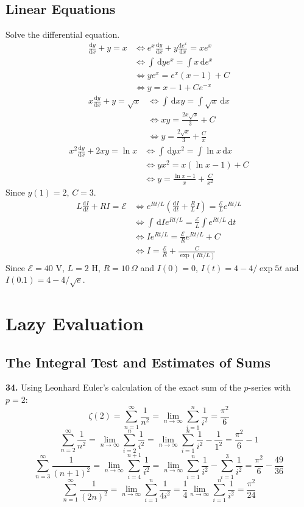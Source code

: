 \documentclass[a4paper,12pt]{article}
\newcommand{\ud}{\,\mathrm{d}}
\newcommand{\leibniz}[3][]{\frac{\mathrm{d} #1 #2}{\mathrm{d} #3 #1}}
\begin{document}
\subsection{Linear Equations}
Solve the differential equation.
\begin{align*}
  \leibniz{y}{x} + y = x
  &\iff e^x\leibniz{y}{x} + y\leibniz{e^x}{x} = xe^x\\
  &\iff \int\ud ye^x = \int x\ud e^x\\
  &\iff ye^x = e^x(x - 1) + C\\
  &\iff y = x - 1 + Ce^{-x}\tag{7}
\end{align*}
\begin{align*}
  x\leibniz{y}{x} + y = \sqrt x
  &\iff \int\ud xy = \int\sqrt x\ud x\\
  &\iff xy = \frac{2x\sqrt x}{3} + C\\
  &\iff y = \frac{2\sqrt x}{3} + \frac{C}{x}\tag{9}
\end{align*}
\begin{align*}
  x^2\leibniz{y}{x} + 2xy = \ln x
  &\iff \int\ud yx^2 = \int\ln x\ud x\\
  &\iff yx^2 = x(\ln x - 1) + C\\
  &\iff y = \frac{\ln x - 1}{x} + \frac{C}{x^2}
\end{align*}
Since $y(1) = 2$, $C = 3$.
\begin{align*}
  L\leibniz{I}{t} + RI = \mathcal E
  &\iff e^{Rt/L}\left(\leibniz{I}{t} + \frac{R}{L}I\right)
  = \frac{\mathcal E}{L}e^{Rt/L}\\
  &\iff \int\ud Ie^{Rt/L} = \frac{\mathcal E}{L}\int e^{Rt/L}\ud t\\
  &\iff Ie^{Rt/L} = \frac{\mathcal E}{R}e^{Rt/L} + C\\
  &\iff I = \frac{\mathcal E}{R} + \frac{C}{\exp(Rt/L)}
\end{align*}
Since $\mathcal E = 40$ V, $L = 2$ H, $R = 10\,\Omega$ and $I(0) = 0$,
$I(t) = 4 - 4/\exp 5t$ and $I(0.1) = 4 - 4/\sqrt e$.

\allowdisplaybreaks
\setcounter{section}{10}
\section{Lazy Evaluation}
\setcounter{subsection}{2}
\subsection{The Integral Test and Estimates of Sums}
\textbf{34. }Using Leonhard Euler's calculation of the exact sum of
the $p$-series with $p = 2$:
\[\zeta(2) = \sum_{n=1}^\infty\frac{1}{n^2}
= \lim_{n\to\infty}\sum_{i=1}^n\frac{1}{i^2} = \frac{\pi^2}{6}\]
\[\sum_{n=2}^\infty\frac{1}{n^2} = \lim_{n\to\infty}\sum_{i=2}^n\frac{1}{i^2}
= \lim_{n\to\infty}\sum_{i=1}^n\frac{1}{i^2} - \frac{1}{1^2}
= \frac{\pi^2}{6} - 1\tag{a}\]
\[\sum_{n=3}^\infty\frac{1}{(n + 1)^2}
= \lim_{n\to\infty}\sum_{i=4}^{n+1}\frac{1}{i^2}
= \lim_{n\to\infty}\sum_{i=1}^n\frac{1}{i^2} - \sum_{i=1}^3\frac{1}{i^2}
= \frac{\pi^2}{6} - \frac{49}{36}\tag{b}\]
\[\sum_{n=1}^\infty\frac{1}{(2n)^2}
= \lim_{n\to\infty}\sum_{i=1}^n\frac{1}{4i^2}
= \frac{1}{4}\lim_{n\to\infty}\sum_{i=1}^n\frac{1}{i^2}
= \frac{\pi^2}{24}\tag{c}\]
\end{document}
